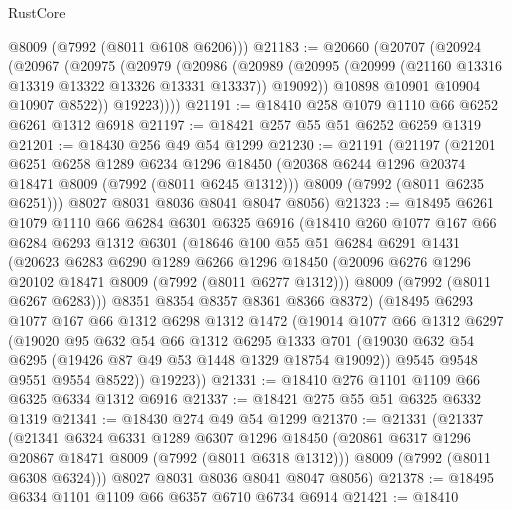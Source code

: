 \begin{lexlean}{RustCore}
\begin{coremodule}
      @8009
      (@7992 (@8011 @6108 @6206)))
@21183 := @20660
    (@20707
      (@20924
        (@20967
          (@20975
            (@20979
              (@20986
                (@20989 (@20995 (@20999 (@21160 @13316 @13319 @13322 @13326 @13331 @13337)) @19092))
                @10898
                @10901
                @10904
                @10907
                @8522))
            @19223))))
@21191 := @18410 @258 @1079 @1110 @66 @6252 @6261 @1312 @6918
@21197 := @18421 @257 @55 @51 @6252 @6259 @1319
@21201 := @18430 @256 @49 @54 @1299
@21230 := @21191
    (@21197
      (@21201
        @6251
        @6258
        @1289
        @6234
        @1296
        @18450
        (@20368 @6244 @1296 @20374 @18471 @8009 (@7992 (@8011 @6245 @1312)))
        @8009
        (@7992 (@8011 @6235 @6251)))
      @8027
      @8031
      @8036
      @8041
      @8047
      @8056)
@21323 := @18495
    @6261
    @1079
    @1110
    @66
    @6284
    @6301
    @6325
    @6916
    (@18410
      @260
      @1077
      @167
      @66
      @6284
      @6293
      @1312
      @6301
      (@18646
        @100
        @55
        @51
        @6284
        @6291
        @1431
        (@20623
          @6283
          @6290
          @1289
          @6266
          @1296
          @18450
          (@20096 @6276 @1296 @20102 @18471 @8009 (@7992 (@8011 @6277 @1312)))
          @8009
          (@7992 (@8011 @6267 @6283)))
        @8351
        @8354
        @8357
        @8361
        @8366
        @8372)
      (@18495
        @6293
        @1077
        @167
        @66
        @1312
        @6298
        @1312
        @1472
        (@19014
          @1077
          @66
          @1312
          @6297
          (@19020
            @95
            @632
            @54
            @66
            @1312
            @6295
            @1333
            @701
            (@19030 @632 @54 @6295 (@19426 @87 @49 @53 @1448 @1329 @18754 @19092))
            @9545
            @9548
            @9551
            @9554
            @8522))
        @19223))
@21331 := @18410 @276 @1101 @1109 @66 @6325 @6334 @1312 @6916
@21337 := @18421 @275 @55 @51 @6325 @6332 @1319
@21341 := @18430 @274 @49 @54 @1299
@21370 := @21331
    (@21337
      (@21341
        @6324
        @6331
        @1289
        @6307
        @1296
        @18450
        (@20861 @6317 @1296 @20867 @18471 @8009 (@7992 (@8011 @6318 @1312)))
        @8009
        (@7992 (@8011 @6308 @6324)))
      @8027
      @8031
      @8036
      @8041
      @8047
      @8056)
@21378 := @18495 @6334 @1101 @1109 @66 @6357 @6710 @6734 @6914
@21421 := @18410

\end{coremodule}
\end{lexlean}
